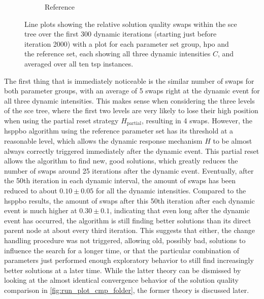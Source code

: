 \begin{figure}[H]
\begin{subfigure}{0.472\textwidth}
		\caption{Reference}
		\label{fig:run_plot_cmp_dynamic_swaps_Reference.svg}
	\end{subfigure}
	\caption[Line plots showing the swaps within the \gls{sce} tree over dynamic iterations for both parameter set groups showing all three dynamic intensities $C$, and averaged over \gls{tsp} instances.]{Line plots showing the relative solution quality swaps within the \gls{sce} tree over the first 300 dynamic iterations (starting just before iteration 2000) with a plot for each parameter set group, \gls{hpo} and the reference set, each showing all three dynamic intensities $C$, and averaged over all ten \gls{tsp} instances.}
	\label{fig:run_plot_cmp_dynamic_swaps}
\end{figure}

The first thing that is immediately noticeable is the similar number of swaps for both parameter groups, with an average of 5 swaps right at the dynamic event for all three dynamic intensities. This makes sense when considering the three levels of the \gls{sce} tree, where the first two levels are very likely to lose their high position when using the partial reset strategy $H_\text{partial}$, resulting in 4 swaps. However, the \gls{hsppbo} algorithm using the reference parameter set has its threshold at a reasonable level, which allows the dynamic response mechanism $H$ to be almost always correctly triggered immediately after the dynamic event. This partial reset allows the algorithm to find new, good solutions, which greatly reduces the number of swaps around 25 iterations after the dynamic event. Eventually, after the 50th iteration in each dynamic interval, the amount of swaps has been reduced to about $0.10 \pm 0.05$ for all the dynamic intensities. Compared to the \gls{hsppbo} results, the amount of swaps after this 50th iteration after each dynamic event is much higher at $0.30 \pm 0.1$, indicating that even long after the dynamic event has occurred, the algorithm is still finding better solutions than its direct parent node at about every third iteration. This suggests that either, the change handling procedure was not triggered, allowing old, possibly bad, solutions to influence the search for a longer time, or that the particular combination of parameters just performed enough exploratory behavior to still find increasingly better solutions at a later time. While the latter theory can be dismissed by looking at the almost identical convergence behavior of the solution quality comparison in \cref{fig:run_plot_cmp_folder}, the former theory is discussed later.

